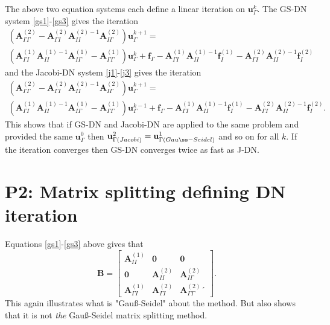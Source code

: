 \documentclass[12pt,a4paper]{report}
\begin{document}
The above two equation systems each define a linear iteration on $\mathbf{u}_\Gamma^{k}$. The GS-DN system \eqref{gs1}-\eqref{gs3} gives the iteration
\begin{align}
\label{itgs}
(\mathbf{A}_{\Gamma \Gamma}^{(2)} - \mathbf{A}_{\Gamma I}^{(2)} \mathbf{A}_{II}^{(2)-1} \mathbf{A}_{I\Gamma}^{(2)}) \mathbf{u}_\Gamma^{k+1} = \\
\nonumber
 (\mathbf{A}_{\Gamma I}^{(1)}\mathbf{A}_{II}^{(1)-1}\mathbf{A}_{I\Gamma}^{(1)} - \mathbf{A}_{\Gamma \Gamma}^{(1)}) \mathbf{u}_\Gamma^{k} + \mathbf{f}_\Gamma - \mathbf{A}_{\Gamma I}^{(1)}\mathbf{A}_{II}^{(1)-1} \mathbf{f}^{(1)}_I  - \mathbf{A}_{\Gamma I}^{(2)} \mathbf{A}_{II}^{(2)-1}\mathbf{f}^{(2)}_I
\end{align}
and the Jacobi-DN system \eqref{j1}-\eqref{j3} gives the iteration
\begin{align}
(\mathbf{A}_{\Gamma \Gamma}^{(2)} - \mathbf{A}_{\Gamma I}^{(2)} \mathbf{A}_{II}^{(2)-1} \mathbf{A}_{I\Gamma}^{(2)}) \mathbf{u}_\Gamma^{k+1} = \\
\nonumber
(\mathbf{A}_{\Gamma I}^{(1)}\mathbf{A}_{II}^{(1)-1}\mathbf{A}_{I\Gamma}^{(1)} - \mathbf{A}_{\Gamma \Gamma}^{(1)}) \mathbf{u}_\Gamma^{k-1} + \mathbf{f}_\Gamma - \mathbf{A}_{\Gamma I}^{(1)}\mathbf{A}_{II}^{(1)-1} \mathbf{f}^{(1)}_I  - \mathbf{A}_{\Gamma I}^{(2)} \mathbf{A}_{II}^{(2)-1}\mathbf{f}^{(2)}_I.
\end{align}
This shows that if GS-DN and Jacobi-DN are applied to the same problem and provided the same $\mathbf{u}_{\Gamma}^0$ then $\mathbf{u}_{\Gamma(Jacobi)}^2 = \mathbf{u}_{\Gamma(Gau\ss-Seidel)}^1$ and so on for all $k$. If the iteration converges then GS-DN converges twice as fast as J-DN.

\section*{P2: Matrix splitting defining DN iteration }

Equations \eqref{gs1}-\eqref{gs3} above gives that
\begin{equation}
\mathbf{B} =
\begin{bmatrix}
\mathbf{A}_{II}^{(1)} & \mathbf{0} & \mathbf{0} \\
\mathbf{0} & \mathbf{A}_{II}^{(2)} & \mathbf{A}_{I\Gamma}^{(2)} \\
\mathbf{A}_{\Gamma I}^{(1)} & \mathbf{A}_{\Gamma I}^{(2)} & \mathbf{A}_{\Gamma \Gamma}^{(2)}´
\end{bmatrix}.
\end{equation}
This again illustrates what is "Gau\ss-Seidel" about the method. But also shows that it is not \textit{the} Gau\ss-Seidel matrix splitting method.
\end{document}
